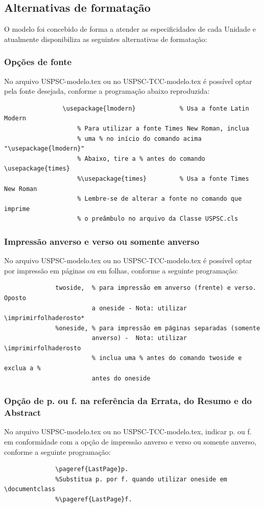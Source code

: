 \subsection{Alternativas de formatação}
O modelo foi concebido de forma a atender as especificidades de cada Unidade e atualmente disponibiliza as seguintes alternativas de formatação:
\subsubsection{Opções de fonte} 
No arquivo USPSC-modelo.tex ou no USPSC-TCC-modelo.tex é possível optar pela fonte desejada, conforme a programação abaixo reproduzida:
				\begin{verbatim}
				\usepackage{lmodern}			% Usa a fonte Latin Modern
					% Para utilizar a fonte Times New Roman, inclua 
					% uma % no início do comando acima  "\usepackage{lmodern}"
					% Abaixo, tire a % antes do comando  \usepackage{times}
					%\usepackage{times}			% Usa a fonte Times New Roman
					% Lembre-se de alterar a fonte no comando que imprime 
					% o preâmbulo no arquivo da Classe USPSC.cls					
				\end{verbatim}
\subsubsection{Impressão anverso e verso ou somente anverso}
No arquivo USPSC-modelo.tex ou no USPSC-TCC-modelo.tex é possível optar por impressão em páginas ou em folhas, conforme a seguinte programação:
			  \begin{verbatim}
			  twoside,  % para impressão em anverso (frente) e verso. Oposto 
			            a oneside - Nota: utilizar \imprimirfolhaderosto*
			  %oneside, % para impressão em páginas separadas (somente 
			            anverso) -  Nota: utilizar \imprimirfolhaderosto
			            % inclua uma % antes do comando twoside e exclua a % 
			            antes do oneside 
			  \end{verbatim}			  
\subsubsection{Opção de p. ou f. na referência da Errata, do Resumo e do Abstract} 
 No arquivo USPSC-modelo.tex ou no USPSC-TCC-modelo.tex, indicar p. ou f. em conformidade com a opção de impressão anverso e verso ou somente anverso, conforme a seguinte programação:
			  \begin{verbatim}
			  \pageref{LastPage}p. 
			  %Substitua p. por f. quando utilizar oneside em \documentclass
			  %\pageref{LastPage}f.
			  \end{verbatim}			  
